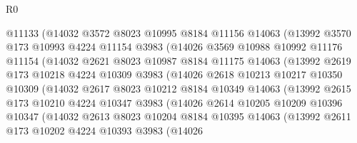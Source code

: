 \begin{lexlean}{R0}
\begin{coremodule}
                @11133
                (@14032
                  @3572
                  @8023
                  @10995
                  @8184
                  @11156
                  @14063
                  (@13992
                    @3570
                    @173
                    @10993
                    @4224
                    @11154
                    @3983
                    (@14026
                      @3569
                      @10988
                      @10992
                      @11176
                      @11154
                      (@14032
                        @2621
                        @8023
                        @10987
                        @8184
                        @11175
                        @14063
                        (@13992
                          @2619
                          @173
                          @10218
                          @4224
                          @10309
                          @3983
                          (@14026
                            @2618
                            @10213
                            @10217
                            @10350
                            @10309
                            (@14032
                              @2617
                              @8023
                              @10212
                              @8184
                              @10349
                              @14063
                              (@13992
                                @2615
                                @173
                                @10210
                                @4224
                                @10347
                                @3983
                                (@14026
                                  @2614
                                  @10205
                                  @10209
                                  @10396
                                  @10347
                                  (@14032
                                    @2613
                                    @8023
                                    @10204
                                    @8184
                                    @10395
                                    @14063
                                    (@13992
                                      @2611
                                      @173
                                      @10202
                                      @4224
                                      @10393
                                      @3983
                                      (@14026

\end{coremodule}
\end{lexlean}
